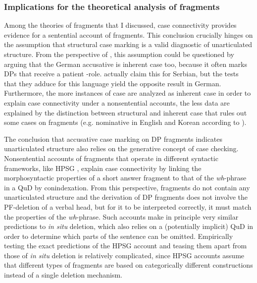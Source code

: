 \subsubsection{Implications for the theoretical analysis of fragments}

Among the theories of fragments that I discussed, case connectivity provides evidence for a sentential account of fragments. This conclusion crucially hinges on the assumption that structural case marking is a valid diagnostic of unarticulated structure. From the perspective of \citet{barton.progovac2005}, this assumption could be questioned by arguing that the German accusative is inherent case too, because it often marks DPs that receive a patient \texttheta-role. \citet{progovac.etal2006} actually claim this for Serbian, but the tests that they adduce for this language yield the opposite result in German. Furthermore, the more instances of case are analyzed as inherent case in order to explain case connectivity under a nonsentential accounts, the less data are explained by the distinction between structural and inherent case that rules out some cases on fragments (e.g. nominative in English and Korean according to \citet{barton.progovac2005}). 

The conclusion that accusative case marking on DP fragments indicates unarticulated structure also relies on the generative concept of case checking. Nonsentential accounts of fragments that operate in different syntactic frameworks, like HPSG \citep{ginzburg.sag2000, fernandez.ginzburg2002, schlangen2003}, explain case connectivity by linking the morphosyntactic properties of a short answer fragment to that of the \textit{wh}-phrase in a QuD by conindexation. From this perspective, fragments do not contain any unarticulated structure and the derivation of DP fragments does not involve the PF-deletion of a verbal head, but for it to be interpreted correctly, it must match the properties of the \textit{wh}-phrase. Such accounts make in principle very similar predictions to \textit{in situ} deletion, which also relies on a (potentially implicit) QuD in order to determine which parts of the sentence can be omitted. Empirically testing the exact predictions of the HPSG account and teasing them apart from those of \textit{in situ} deletion is relatively complicated, since HPSG accounts assume that different types of fragments are based on categorically different constructions instead of a single deletion mechanism.

